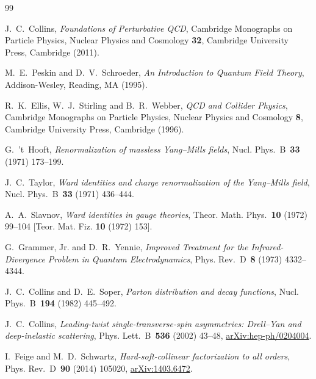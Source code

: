 \begin{thebibliography}{99}

J.~C.~Collins, \emph{Foundations of Perturbative QCD}, Cambridge Monographs on Particle Physics, Nuclear Physics and Cosmology \textbf{32}, Cambridge University Press, Cambridge (2011).

M.~E.~Peskin and D.~V.~Schroeder, \emph{An Introduction to Quantum Field Theory}, Addison-Wesley, Reading, MA (1995).

R.~K.~Ellis, W.~J.~Stirling and B.~R.~Webber, \emph{QCD and Collider Physics}, Cambridge Monographs on Particle Physics, Nuclear Physics and Cosmology \textbf{8}, Cambridge University Press, Cambridge (1996).

G.~'t~Hooft, \emph{Renormalization of massless Yang--Mills fields}, Nucl. Phys.~B~\textbf{33} (1971) \mbox{173--199}.

J.~C.~Taylor, \emph{Ward identities and charge renormalization of the Yang--Mills field}, Nucl. Phys.~B~\textbf{33} (1971) \mbox{436--444}.

A.~A.~Slavnov, \emph{Ward identities in gauge theories}, Theor. Math. Phys.~\textbf{10} (1972) \mbox{99--104} [Teor. Mat. Fiz. \textbf{10} (1972) \mbox{153}].

G.~Grammer, Jr. and D.~R.~Yennie, \emph{Improved Treatment for the Infrared-Divergence Problem in Quantum Electrodynamics}, Phys. Rev.~D~\textbf{8} (1973) \mbox{4332--4344}.

J.~C.~Collins and D.~E.~Soper, \emph{Parton distribution and decay functions}, Nucl. Phys.~B~\textbf{194} (1982) \mbox{445--492}.

J.~C.~Collins, \emph{Leading-twist single-transverse-spin asymmetries: Drell--Yan and deep-inelastic scattering}, Phys. Lett.~B~\textbf{536} (2002) \mbox{43--48}, \href{https://arxiv.org/abs/hep-ph/0204004}{arXiv:hep-ph/0204004}.

I.~Feige and M.~D.~Schwartz, \emph{Hard-soft-collinear factorization to all orders}, Phys. Rev.~D~\textbf{90} (2014) \mbox{105020}, \href{https://arxiv.org/abs/1403.6472}{arXiv:1403.6472}.


\end{thebibliography}
